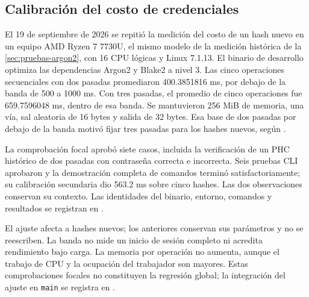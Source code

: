 \subsection{Calibración del costo de credenciales}\label{sec:calibracion-credenciales}

El 19 de septiembre de 2026 se repitió la medición del costo de un hash nuevo en un equipo AMD Ryzen 7 7730U, el mismo modelo de la medición histórica de la \cref{sec:pruebas-argon2}, con 16 CPU lógicas y Linux 7.1.13. El binario de desarrollo optimiza las dependencias Argon2 y Blake2 a nivel 3. Las cinco operaciones secuenciales con dos pasadas promediaron 400.3851816 ms, por debajo de la banda de 500 a 1000 ms. Con tres pasadas, el promedio de cinco operaciones fue 659.7596048 ms, dentro de esa banda. Se mantuvieron 256 MiB de memoria, una vía, sal aleatoria de 16 bytes y salida de 32 bytes. Esa base de dos pasadas por debajo de la banda motivó fijar tres pasadas para los hashes nuevos, según .

La comprobación focal aprobó siete casos, incluida la verificación de un PHC histórico de dos pasadas con contraseña correcta e incorrecta. Seis pruebas CLI aprobaron y la demostración completa de comandos terminó satisfactoriamente; su calibración secundaria dio 563.2 ms sobre cinco hashes. Las dos observaciones conservan su contexto. Las identidades del binario, entorno, comandos y resultados se registran en .

El ajuste afecta a hashes nuevos; los anteriores conservan sus parámetros y no se reescriben. La banda no mide un inicio de sesión completo ni acredita rendimiento bajo carga. La memoria por operación no aumenta, aunque el trabajo de CPU y la ocupación del trabajador son mayores. Estas comprobaciones focales no constituyen la regresión global; la integración del ajuste en \texttt{main} se registra en .

